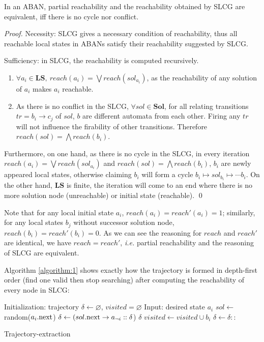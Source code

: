 \documentclass[runningheads]{llncs}
\newcommand{\acm}[3]{#1\rightarrow#2}
\begin{document}
\begin{theorem}
In an ABAN, partial reachability and the reachability obtained by SLCG are equivalent, iff there is no cycle nor conflict.
\end{theorem}
\begin{proof}
Necessity: SLCG gives a necessary condition of reachability, thus all reachable local states in ABANs satisfy their reachability suggested by SLCG.

Sufficiency: in SLCG, the reachability is computed recursively.
\begin{enumerate}
\item $\forall a_i\in \mathbf{LS},\ reach(a_i)=\bigvee reach(sol_{a_i})$, as the reachability of any solution
of $a_i$ makes $a_i$ reachable.\label{1}
\item As there is no conflict in the SLCG, $\forall sol\in \mathbf{Sol}$, for all relating transitions $tr=\acm{b_i}{c_j}{c_k}$ of $sol$, $b$ are different automata from each other.
Firing any $tr$ will not influence the firability of other transitions. Therefore $reach(sol)=\bigwedge reach(b_i)$.
\end{enumerate}
Furthermore, on one hand, as there is no cycle in the SLCG, in every iteration $reach(a_i)=\bigvee reach(sol_{a_i})$ and $reach(sol)=\bigwedge reach(b_i)$, $b_i$ are newly appeared local states, otherwise claiming $b_i$ will form a cycle $b_i\mapsto sol_{b_i}\mapsto \cdots b_i$.
On the other hand, $\mathbf{LS}$ is finite, the iteration will come to an end where there is no more solution node (unreachable) or initial state (reachable).	
\qed\end{proof} 

Note that for any local initial state $a_i$, $reach(a_i)=reach'(a_i)=1$; similarly, for any local states $b_j$ without successor solution node, $reach(b_i)=reach'(b_i)=0$.
As we can see the reasoning for $reach$ and $reach'$ are identical, we have $reach=reach'$, \textit{i.e.} partial reachability and the reasoning of SLCG are equivalent.

Algorithm \ref{algorithm:1} shows exactly how the trajectory is formed in depth-first order (find one valid then stop searching) after computing the reachability of every node in SLCG:

\begin{algorithm}[ht]
\begin{algorithmic}
\State Initialization: trajectory $\delta\gets\varnothing$, $visited=\varnothing$
\State Input: desired state $a_i$
	\State $sol\gets $random($a_i{\rm .next}$)%
	\State $\delta \gets (\acm{sol{\rm .next}}{a_{\lnot i}}{a_i}::\delta$)
    	\State \Return $\delta$
    \EndIf
        	\State$visited\gets visited\cup b_i$
            \State $\delta\gets \delta::$
        \EndFor
    \EndIf
\EndFunction
\end{algorithmic}
\caption{Trajectory-extraction}
\label{algorithm:1}
\end{algorithm}
\end{document}
